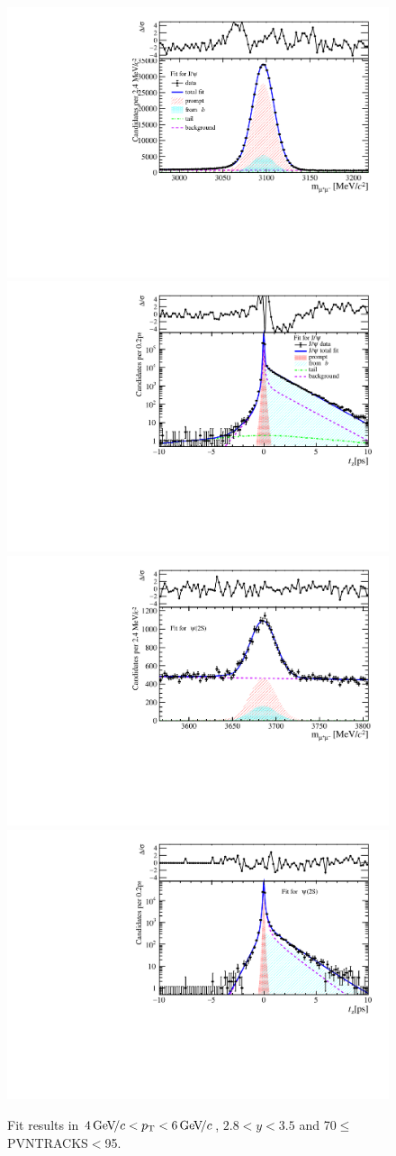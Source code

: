 \begin{figure}[H]
\begin{center}
\includegraphics[width=0.47\linewidth]{pdf/Jpsi/drawmass/n4y2pt3.pdf}
\includegraphics[width=0.47\linewidth]{pdf/Jpsi/2DFit/n4y2pt3.pdf}
\vspace*{-0.5cm}
\includegraphics[width=0.47\linewidth]{pdf/Psi2S/drawmass/n4y2pt3.pdf}
\includegraphics[width=0.47\linewidth]{pdf/Psi2S/2DFit/n4y2pt3.pdf}
\vspace*{-0.5cm}
\end{center}
\caption{Fit results in $4\text{\,Ge\kern -0.1em V\!/}c<p_{\mathrm{T}}<6\text{\,Ge\kern -0.1em V\!/}c$, $2.8<y<3.5$ and 70$\leq$PVNTRACKS$<$95.}
\label{Fitn4y2pt3}
\end{figure}
